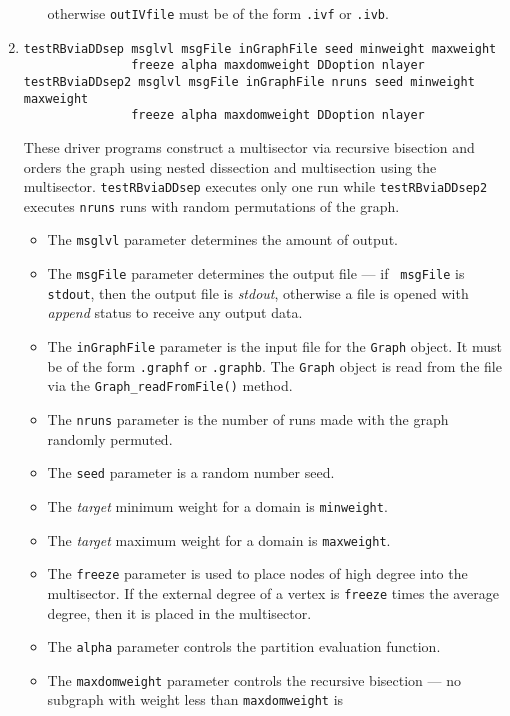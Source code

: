 \begin{enumerate}
\begin{itemize}
otherwise {\tt outIVfile} 
must be of the form {\tt *.ivf} or {\tt *.ivb}.
\end{itemize}
\item
\begin{verbatim}
testRBviaDDsep msglvl msgFile inGraphFile seed minweight maxweight
               freeze alpha maxdomweight DDoption nlayer
testRBviaDDsep2 msglvl msgFile inGraphFile nruns seed minweight maxweight
               freeze alpha maxdomweight DDoption nlayer
\end{verbatim}
These driver programs construct a multisector via recursive 
bisection and orders the graph using nested dissection and 
multisection using the multisector.
{\tt testRBviaDDsep} executes only one run while
{\tt testRBviaDDsep2} executes {\tt nruns} runs with random
permutations of the graph.
\par
\begin{itemize}
\item
The {\tt msglvl} parameter determines the amount of output.
\item
The {\tt msgFile} parameter determines the output file --- if {\tt
msgFile} is {\tt stdout}, then the output file is {\it stdout},
otherwise a file is opened with {\it append} status to receive any
output data.
\item
The {\tt inGraphFile} parameter is the input file for the {\tt Graph}
object. It must be of the form {\tt *.graphf} or {\tt *.graphb}.
The {\tt Graph} object is read from the file via the
{\tt Graph\_readFromFile()} method.
\item
The {\tt nruns} parameter is the number of runs made with the
graph randomly permuted.
\item
The {\tt seed} parameter is a random number seed.
\item
The {\it target} minimum weight for a domain is {\tt minweight}.
\item
The {\it target} maximum weight for a domain is {\tt maxweight}.
\item
The {\tt freeze} parameter is used to place nodes of high degree
into the multisector.
If the external degree of a vertex is {\tt freeze} times the
average degree, then it is placed in the multisector.
\item
The {\tt alpha} parameter controls the partition evaluation function.
\item
The {\tt maxdomweight} parameter controls the recursive bisection
--- no subgraph with weight less than {\tt maxdomweight} is

\end{itemize}
\end{enumerate}

